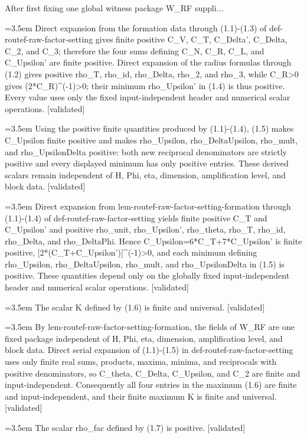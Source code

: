 \documentclass{article}
\newcommand{\step}[1]{\par\noindent\hangindent=3.5em\hangafter=1%
  \makebox[3.5em][l]{\textbf{#1.}}}
\newcommand{\steptag}[1]{\hfill{\small\textsf{[#1]}}}
\begin{document}
\begin{proofbox}{After first fixing one global witness package W\_RF suppli...}
\step{1.2.3.1} Direct expansion from the formation data through (1.1)-(1.3) of def-routef-raw-factor-setting gives finite positive C\_V, C\_T, C\_Delta', C\_Delta, C\_2, and C\_3; therefore the four sums defining C\_N, C\_R, C\_L, and C\_Upsilon' are finite positive. Direct expansion of the radius formulas through (1.2) gives positive rho\_T, rho\_id, rho\_Delta, rho\_2, and rho\_3, while C\_R>0 gives (2*C\_R)\textasciicircum{}(-1)>0; their minimum rho\_Upsilon' in (1.4) is thus positive. Every value uses only the fixed input-independent header and numerical scalar operations. \steptag{validated} \\[4pt]
\step{1.2.4} Using the positive finite quantities produced by (1.1)-(1.4), (1.5) makes C\_Upsilon finite positive and makes rho\_Upsilon, rho\_DeltaUpsilon, rho\_mult, and rho\_UpsilonDelta positive: both new reciprocal denominators are strictly positive and every displayed minimum has only positive entries. These derived scalars remain independent of H, Phi, eta, dimension, amplification level, and block data. \steptag{validated} \\[6pt]
\step{1.2.4.1} Direct expansion from lem-routef-raw-factor-setting-formation through (1.1)-(1.4) of def-routef-raw-factor-setting yields finite positive C\_T and C\_Upsilon' and positive rho\_unit, rho\_Upsilon', rho\_theta, rho\_T, rho\_id, rho\_Delta, and rho\_DeltaPhi. Hence C\_Upsilon=6*C\_T+7*C\_Upsilon' is finite positive, [2*(C\_T+C\_Upsilon')]\textasciicircum{}(-1)>0, and each minimum defining rho\_Upsilon, rho\_DeltaUpsilon, rho\_mult, and rho\_UpsilonDelta in (1.5) is positive. These quantities depend only on the globally fixed input-independent header and numerical scalar operations. \steptag{validated} \\[4pt]
\step{1.3} The scalar K defined by (1.6) is finite and universal. \steptag{validated} \\[6pt]
\step{1.3.1} By lem-routef-raw-factor-setting-formation, the fields of W\_RF are one fixed package independent of H, Phi, eta, dimension, amplification level, and block data. Direct serial expansion of (1.1)-(1.5) in def-routef-raw-factor-setting uses only finite real sums, products, maxima, minima, and reciprocals with positive denominators, so C\_theta, C\_Delta, C\_Upsilon, and C\_2 are finite and input-independent. Consequently all four entries in the maximum (1.6) are finite and input-independent, and their finite maximum K is finite and universal. \steptag{validated} \\[4pt]
\step{1.4} The scalar rho\_fac defined by (1.7) is positive. \steptag{validated} \\[6pt]

\end{proofbox}
\end{document}
